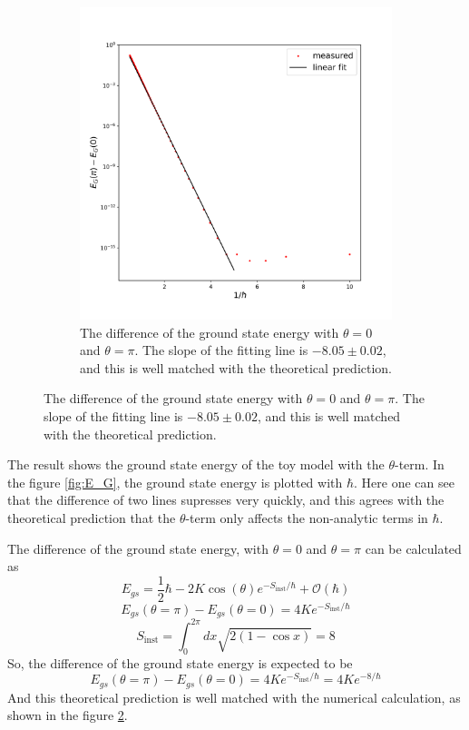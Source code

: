 \documentclass{article}
\begin{document}
\begin{figure}[]
\begin{subfigure}{0.5\textwidth}
        \includegraphics[width=\textwidth]{E_G_diff.png}
        \caption{The difference of the ground state energy with $\theta=0$ and $\theta=\pi$. The slope of the fitting line is $-8.05\pm 0.02$, and this is well matched with the theoretical prediction.}
        \label{fig:E_G_diff}
    \end{subfigure}
\end{figure}

The result shows the ground state energy of the toy model with the $\theta$-term.
In the figure \ref{fig:E_G}, the ground state energy is plotted with $\hbar$.
Here one can see that the difference of two lines supresses very quickly, and this agrees with the theoretical prediction that the $\theta$-term only affects the non-analytic terms in $\hbar$.

The difference of the ground state energy, with $\theta=0$ and $\theta=\pi$ can be calculated as
\[
    E_{gs} = \frac{1}{2}\hbar-2K \cos (\theta ) e^{-S_{\text{inst}}/\hbar}+ \mathcal{O}(\hbar)
\]
\[
    E_{gs}(\theta=\pi)-E_{gs}(\theta=0) = 4K e^{-S_{\text{inst}}/\hbar}
\]
\[
    S_{\text{inst}} = \int_0^{2\pi} dx \sqrt{2(1-\cos x)} = 8
\]
So, the difference of the ground state energy is expected to be
\[
    E_{gs}(\theta=\pi)-E_{gs}(\theta=0) = 4K e^{-S_{\text{inst}}/\hbar} = 4K e^{-8/\hbar}
\]
And this theoretical prediction is well matched with the numerical calculation, as shown in the figure \ref{fig:E_G_diff}.
\end{document}
